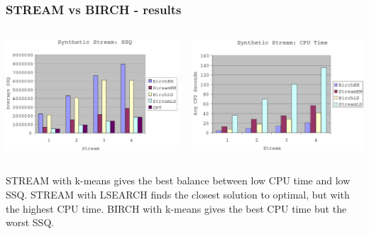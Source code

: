 \documentclass{beamer}
\begin{document}
\frame
{
  \frametitle{STREAM vs BIRCH - results}
  
  \begin{columns}
  
    \begin{column}{0.5\textwidth}
    	   \begin{center}
         \includegraphics[width=\textwidth]{figures/BIRCH_STREAM_SSQ.png}      
       \end{center}
    	  
    \end{column}
    
    \begin{column}{0.5\textwidth}
        \begin{center}
         \includegraphics[width=\textwidth]{figures/BIRCH_STREAM_CPU.png}      
        \end{center}
    \end{column}
  \end{columns}  
  
  \bigskip
  STREAM with k-means gives the best balance between low CPU time and low SSQ. STREAM with LSEARCH finds the closest solution to optimal, but with the highest CPU time. BIRCH with k-means gives the best CPU time but the worst SSQ.
}



  
\end{document}

